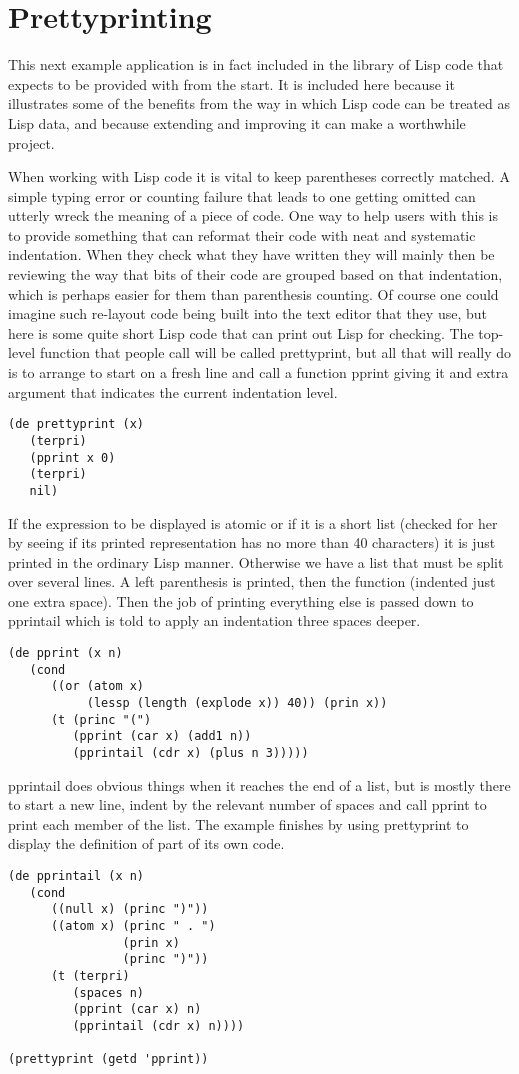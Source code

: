 \section{Prettyprinting}
This next example application is in fact included in the library of Lisp
code that \vsl{} expects to be provided with from the start. It is
included here because it illustrates some of the benefits from the way
in which Lisp code can be treated as Lisp data, and because extending and
improving it can make a worthwhile project.

When working with Lisp code it is vital to keep parentheses correctly matched.
A simple typing error or counting failure that leads to one getting
omitted can utterly wreck the meaning of a piece of code. One way to
help users with this is to provide something that can reformat their
code with neat and systematic indentation. When they check what they have
written they will mainly then be reviewing the way that bits of their code
are grouped based on that indentation, which is perhaps easier for them
than parenthesis counting. Of course one could imagine such re-layout code
being built into the text editor that they use, but here is some quite
short Lisp code that can print out Lisp for checking. The top-level
function that people call will be called {\tx prettyprint}, but all
that will really do is to arrange to start on a fresh line and call a function
{\tx pprint} giving it and extra argument that indicates the current
indentation level.
{\small\begin{verbatim}
(de prettyprint (x)
   (terpri)
   (pprint x 0)
   (terpri)
   nil)
\end{verbatim}}

If the expression to be displayed is atomic or if it is a short
list (checked for her by seeing if its printed representation has
no more than 40 characters) it is just printed in the ordinary Lisp
manner. Otherwise we have a list that must be split over several lines.
A left parenthesis is printed, then the function (indented just one
extra space). Then the job of printing everything else is passed down to
{\tx pprintail} which is told to apply an indentation three spaces deeper.
{\small\begin{verbatim}
(de pprint (x n)
   (cond
      ((or (atom x)
           (lessp (length (explode x)) 40)) (prin x))
      (t (princ "(")
         (pprint (car x) (add1 n))
         (pprintail (cdr x) (plus n 3)))))
\end{verbatim}}

{\tx pprintail} does obvious things when it reaches the end of a list,
but is mostly there to start a new line, indent by the relevant number of spaces
and call {\tx pprint} to print each member of the list. The example
finishes by using {\tx prettyprint} to display the definition of part of
its own code.
{\small\begin{verbatim}
(de pprintail (x n)
   (cond
      ((null x) (princ ")"))
      ((atom x) (princ " . ")
                (prin x)
                (princ ")"))
      (t (terpri)
         (spaces n)
         (pprint (car x) n)
         (pprintail (cdr x) n))))

(prettyprint (getd 'pprint))
\end{verbatim}}

